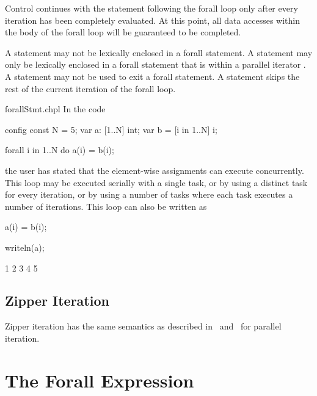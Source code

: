 Control continues with the statement following the forall loop only
after every iteration has been completely evaluated.  At this point,
all data accesses within the body of the forall loop will be
guaranteed to be completed.

A  statement may not be lexically enclosed in a forall
statement. A  statement may only be lexically enclosed in
a forall statement that is within a parallel iterator
.
A  statement may not be used to exit a forall statement.
A  statement skips the rest of the current iteration
of the forall loop.

\begin{chapelexample}{forallStmt.chpl}
In the code
\begin{chapelpre}
config const N = 5;
var a: [1..N] int;
var b = [i in 1..N] i;
\end{chapelpre}
\begin{chapel}
forall i in 1..N do
  a(i) = b(i);
\end{chapel}
the user has stated that the element-wise assignments can execute
concurrently.  This loop may be executed serially with a single task,
or by using a distinct task for every iteration, or by using a number
of tasks where each task executes a number of iterations.  This loop
can also be written as
\begin{chapel}
[i in 1..N] a(i) = b(i);
\end{chapel}
\begin{chapelpost}
writeln(a);
\end{chapelpost}
\begin{chapeloutput}
1 2 3 4 5
\end{chapeloutput}
\end{chapelexample}

\subsection{Zipper Iteration}
\label{forall_zipper}

Zipper iteration has the same semantics as described
in~ and~ for parallel
iteration.

\pagebreak
\section{The Forall Expression}
\label{Forall_Expressions}

